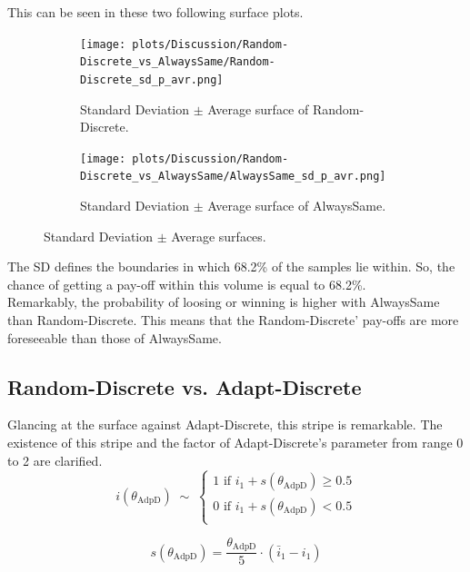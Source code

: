 \documentclass[11pt]{article}
\newcommand{\round}[1]{\ensuremath{\lfloor#1\rceil}}
\begin{document}
	This can be seen in these two following surface plots.
	\begin{figure}[h]
		\centering
		\begin{subfigure}[t]{0.45\textwidth}
			\centering
				\texttt{[image: plots/Discussion/Random-Discrete\_vs\_AlwaysSame/Random-Discrete\_sd\_p\_avr.png]}
			\caption{Standard Deviation $\pm$ Average surface of Random-Discrete.}
			\label{fig:RNDD_sd_pm_avr}
		\end{subfigure}\hfill
		\begin{subfigure}[t]{0.45\textwidth}
			\centering
				\texttt{[image: plots/Discussion/Random-Discrete\_vs\_AlwaysSame/AlwaysSame\_sd\_p\_avr.png]}
			\caption{Standard Deviation $\pm$ Average surface of AlwaysSame.}
			\label{fig:ALWS_sd_pm_avr}
		\end{subfigure}
		\caption{Standard Deviation $\pm$ Average surfaces.}
		\label{fig:Standard Deviation average.}
	\end{figure}

	The SD defines the boundaries in which 68.2\% of the samples lie within.
	So, the chance of getting a pay-off within this volume is equal to 68.2\%.\\
	Remarkably, the probability of loosing or winning is higher with AlwaysSame than Random-Discrete.
	This means that the Random-Discrete' pay-offs are more foreseeable than those of AlwaysSame.

\subsection{Random-Discrete vs. Adapt-Discrete} \label{sec:RndD_vs_AdpD}
		Glancing at the surface against Adapt-Discrete, this stripe is remarkable.
		The existence of this stripe and the factor of Adapt-Discrete's parameter from range 0 to 2 are clarified.\\
	\begin{equation}
		i(\theta_{\mathrm{AdpD}}) \;\sim\;
		\begin{cases}
			1 \text{ if } i_1 + s(\theta_{\mathrm{AdpD}}) \ge 0.5\\
			0 \text{ if } i_1 + s(\theta_{\mathrm{AdpD}}) < 0.5\\
		\end{cases}
		\label{eq:AdpD_rounded}
	\end{equation}

	\begin{equation}
		s(\theta_{\mathrm{AdpD}}) = \frac{\theta_{\mathrm{AdpD}}}{5} \cdot (\bar i_1 - i_1)
		\label{eq:AdpD_eq_s}
	\end{equation}
\end{document}
